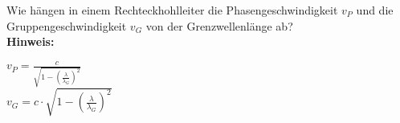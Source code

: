 \begin{question}[section=6,name={Phasen und Gruppengeschwindigkeit},difficulty=,quantity=,type=thr,tags={}]
	Wie hängen in einem Rechteckhohlleiter die Phasengeschwindigkeit $v_P$ und die Gruppengeschwindigkeit $v_G$ von der Grenzwellenlänge ab?
	\\ \textbf{Hinweis:}\\
	
\end{question}
\begin{solution}
	 $v_P=\frac{c}{\sqrt{1-\left(\frac{\lambda}{\lambda_G}\right)^2}} $\\
	$v_G=c\cdot\sqrt{1-\left(\frac{\lambda}{\lambda_G}\right)^2} $
\end{solution}